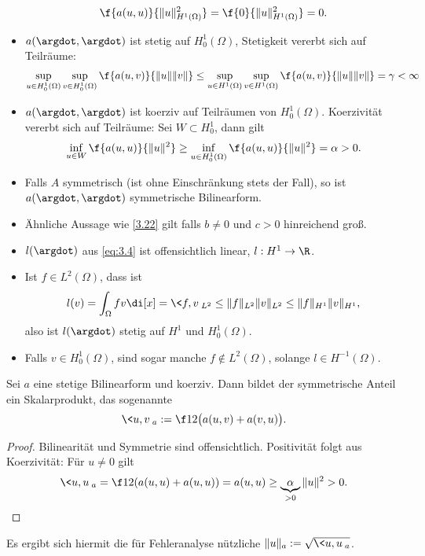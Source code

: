 \begin{st}[Stetigkeit und Koerzivität, $b=0$, $c = 0$]
\begin{note}
\begin{itemize}
				\[
					\f{a(u,u)}{\|u\|_{H^1(\Omega)}^2}
					= \f{0}{\|u\|_{H^1(\Omega)}^2}
					= 0.
				\]
			\item
				$a(\argdot, \argdot)$ ist stetig auf $H_0^1(\Omega)$, Stetigkeit vererbt sich auf Teilräume:
				\begin{align*}
					\sup_{u \in H_0^1(\Omega)} \sup_{v \in H_0^1(\Omega)} \f{a(u,v)}{\|u\|\|v\|}
					\le \sup_{u \in H^1(\Omega)} \sup_{v \in H^1(\Omega)} \f{a(u,v)}{\|u\|\|v\|}
					= \gamma < \infty
				\end{align*}
			\item
				$a(\argdot, \argdot)$ ist koerziv auf Teilräumen von $H_0^1(\Omega)$.
				Koerzivität vererbt sich auf Teilräume:
				Sei $W \subset H_0^1$, dann gilt
				\[
					\inf_{u \in W} \f{a(u,u)}{\|u\|^2}
					\ge \inf_{u \in H_0^1(\Omega)} \f{a(u,u)}{\|u\|^2}
					= \alpha
					> 0.
				\]
			\item
				Falls $A$ symmetrisch (ist ohne Einschränkung stets der Fall), so ist $a(\argdot, \argdot)$ symmetrische Bilinearform.
			\item
				Ähnliche Aussage wie \ref{3.22} gilt falls $b \neq 0$ und $c > 0$ hinreichend groß.
		\end{itemize}
	\end{note}
\end{st}

\begin{note}
	\begin{itemize}
		\item
			$l(\argdot)$ aus \eqref{eq:3.4} ist offensichtlich linear, $l: H^1 \to \R$.
		\item
			Ist $f \in L^2(\Omega)$, dass ist
			\[
				l(v) = \int_\Omega fv \di[x]
				= \<f, v \>_{L^2}
				\le \|f\|_{L^2} \|v\|_{L^2}
				\le \|f\|_{H^1}\|v\|_{H^1},
			\]
			also ist $l(\argdot)$ stetig auf $H^1$ und $H_0^1(\Omega)$.
		\item
			Falls $v \in H_0^1(\Omega)$, sind sogar manche $f \not\in L^2(\Omega)$, solange $l \in H^{-1}(\Omega)$.
	\end{itemize}
\end{note}


\begin{df} \label{3.23}
	Sei $a$ eine stetige Bilinearform und koerziv.
	Dann bildet der symmetrische Anteil ein Skalarprodukt, das sogenannte 
	\[
		\<u,v\>_a :=  \f 12\big(a(u,v) + a(v,u)\big).
	\]
	\begin{proof}
		Bilinearität und Symmetrie sind offensichtlich.
		Positivität folgt aus Koerzivität:
		Für $u \neq 0$ gilt
		\[
			\<u,u\>_a
			= \f 12 (a(u,u) + a(u,u))
			= a(u,u)
			\ge \underbrace{\alpha}_{>0} \|u\|^2
			> 0.
		\]
	\end{proof}
	\begin{note}
		Es ergibt sich hiermit die für Fehleranalyse nützliche  $\|u\|_a := \sqrt{\<u,u\>_a}$.
	\end{note}
\end{df}

